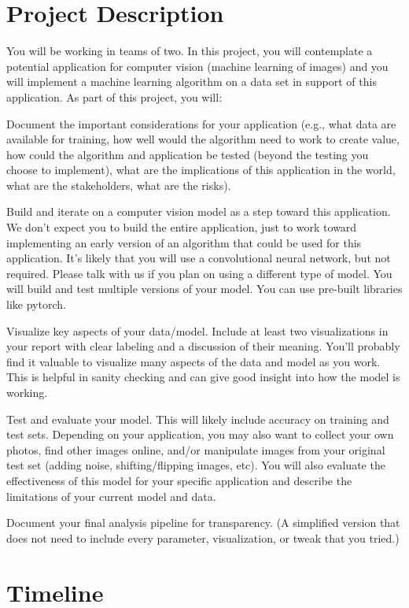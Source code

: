 \documentclass{tufte-handout}
\begin{document}
\section{Project Description}
You will be working in teams of two. In this project, you will contemplate a potential application for computer vision (machine learning of images) and you will implement a machine learning algorithm on a data set in support of this application. As part of this project, you will:
\bi[leftmargin=.5in]
\item Document the important considerations for your application (e.g., what data are available for training, how well would the algorithm need to work to create value, how could the algorithm and application be tested (beyond the testing you choose to implement), what are the implications of this application in the world, what are the stakeholders, what are the risks). 
\item Build and iterate on a computer vision model as a step toward this application. We don’t expect you to build the entire application, just to work toward implementing an early version of an algorithm that could be used for this application. It’s likely that you will use a convolutional neural network, but not required. Please talk with us if you plan on using a different type of model. You will build and test multiple versions of your model. You can use pre-built libraries like pytorch.
\item Visualize key aspects of your data/model. Include at least two visualizations in your report with clear labeling and a discussion of their meaning. You’ll probably find it valuable to visualize many aspects of the data and model as you work. This is helpful in sanity checking and can give good insight into how the model is working.
\item Test and evaluate your model. This will likely include accuracy on training and test sets. Depending on your application, you may also want to collect your own photos, find other images online, and/or manipulate images from your original test set (adding noise, shifting/flipping images, etc). You will also evaluate the effectiveness of this model for your specific application and describe the limitations of your current model and data.
\item Document your final analysis pipeline for transparency. (A simplified version that does not need to include every parameter, visualization, or tweak that you tried.)
\ei

\section{Timeline}
\end{document}

